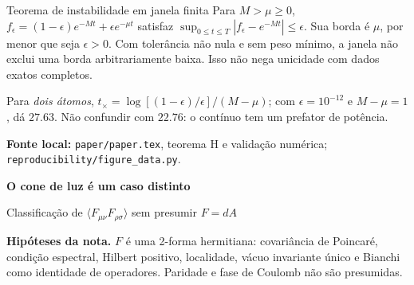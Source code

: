 \documentclass[11pt,a4paper]{article}
\newcommand{\titlepageof}[3]{\vspace*{2mm}{\small\color{rust}\textbf{#1}}\par
 {\LARGE\bfseries\color{ink}#2}\par{\large #3}\par\vspace{2mm}}
\newcommand{\source}[1]{\vfill{\footnotesize\raggedright\color{ink}\textbf{Fonte local:} #1\par}}
\begin{document}
\begin{panel}{Teorema de instabilidade em janela finita}
Para $M>\mu\ge0$,
$f_\epsilon=(1-\epsilon)e^{-Mt}+\epsilon e^{-\mu t}$ satisfaz
$\sup_{0\le t\le T}|f_\epsilon-e^{-Mt}|\le\epsilon$.
Sua borda é $\mu$, por menor que seja $\epsilon>0$.
Com tolerância não nula e sem peso mínimo, a janela não exclui uma borda
arbitrariamente baixa. Isso não nega unicidade com dados exatos completos.
\end{panel}
Para \emph{dois átomos},
$t_\times=\log[(1-\epsilon)/\epsilon]/(M-\mu)$; com
$\epsilon=10^{-12}$ e $M-\mu=1$, dá $27.63$. Não confundir com $22.76$:
o contínuo tem um prefator de potência.
\source{\texttt{paper/paper.tex}, teorema H e validação numérica;
\texttt{reproducibility/figure\_data.py}.}
\newpage
\titlepageof{04 / ESTRUTURA DE QFT}{O cone de luz é um caso distinto}{Classificação de $\langle F_{\mu\nu}F_{\rho\sigma}\rangle$ sem presumir $F=dA$}
\textbf{Hipóteses da nota.} $F$ é uma 2-forma hermitiana: covariância de
Poincaré, condição espectral, Hilbert positivo, localidade, vácuo invariante
único e Bianchi como identidade de operadores. Paridade e fase de Coulomb
não são presumidas.
\end{document}
